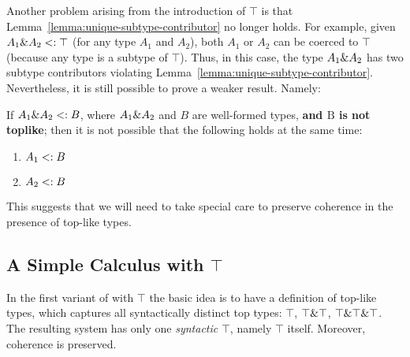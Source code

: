 Another problem arising from the introduction of $\top$ is that Lemma~\ref{lemma:unique-subtype-contributor}
no longer holds. For example, given $A_1 \& A_2 <: \top$ (for
any type $A_1$ and $A_2$), both $A_1$ or $A_2$ can be coerced to
$\top$ (because any type is a subtype of $\top$).
Thus, in this case, the type ${A_1} \& {A_2}$ has two subtype
contributors violating
Lemma~\ref{lemma:unique-subtype-contributor}. Nevertheless,
it is still possible to prove a weaker result.
Namely:

\begin{lemma}
  \label{lemma:unique-subtype-contributor-with-top}

  If $A_1 \& A_2 <: B$, where $A_1 \& A_2$ and $B$ are well-formed types,
  \textbf{and $\text{B}$ is not toplike};
  then it is not possible that the following holds at the same time:
  \begin{enumerate}
    \item $A_1 <: B$
    \item $A_2 <: B$
  \end{enumerate}
\end{lemma}

This suggests that we will need to take special care to preserve
coherence in the presence of top-like types.

\subsection{A Simple Calculus with $\top$}\label{subsec:simpletop}

In the first variant of \name with $\top$ the basic idea is to have a 
definition of top-like types, which captures all syntactically
distinct top types:  $\top$, $\top \& \top$, $\top \& \top
\& \top$. The resulting system has only one \emph{syntactic}
$\top$, namely $\top$ itself. Moreover, coherence is preserved.

